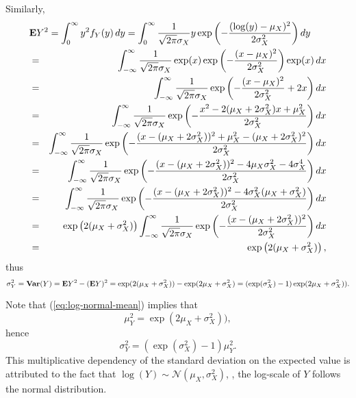 Similarly,
\begin{eqnarray*}
\lefteqn{
\Expect Y^2 = \int_{0}^{\infty} y^2 f_Y(y) \, dy
= \int_{0}^{\infty} \frac{1}{\sqrt{2\pi} \sigma_X }  y \exp\left(-\frac{(\log(y)-\mu_X)^2}{2\sigma_X^2}\right) dy
}
\\
&=&
\int_{-\infty}^{\infty} \frac{1}{\sqrt{2\pi} \sigma_X }  \exp(x) \exp\left(-\frac{(x-\mu_X)^2}{2\sigma_X^2}\right) \exp(x) \, dx
\\
&=&
\int_{-\infty}^{\infty} \frac{1}{\sqrt{2\pi} \sigma_X }  \exp\left(-\frac{(x-\mu_X)^2}{2\sigma_X^2}+2x\right) dx
\\
&=&
\int_{-\infty}^{\infty} \frac{1}{\sqrt{2\pi} \sigma_X }  \exp\left(-\frac{x^2 - 2(\mu_X +2\sigma_X^2)x + \mu_X^2}{2\sigma_X^2}\right) dx
\\
&=&
\int_{-\infty}^{\infty} \frac{1}{\sqrt{2\pi} \sigma_X }  \exp\left(-\frac{(x - (\mu_X +2\sigma_X^2))^2 + \mu_X^2 -(\mu_X+2\sigma_X^2)^2}{2\sigma_X^2}\right) dx
\\
&=&
\int_{-\infty}^{\infty} \frac{1}{\sqrt{2\pi} \sigma_X }  \exp\left(-\frac{(x - (\mu_X +2\sigma_X^2))^2 - 4\mu_X\sigma_X^2 - 4\sigma_X^4}{2\sigma_X^2}\right) dx
\\
&=&
\int_{-\infty}^{\infty} \frac{1}{\sqrt{2\pi} \sigma_X }  \exp\left(-\frac{(x - (\mu_X +2\sigma_X^2))^2 - 4\sigma_X^2(\mu_X+ \sigma_X^2)}{2\sigma_X^2}\right) dx
\\
&=&
\exp\left({2(\mu_X+ \sigma_X^2)}\right)
\int_{-\infty}^{\infty} \frac{1}{\sqrt{2\pi} \sigma_X }  \exp\left(-\frac{(x - (\mu_X +2\sigma_X^2))^2 }{2\sigma_X^2}\right) dx
\\
&=&
\exp\left({2(\mu_X+ \sigma_X^2)}\right),
\end{eqnarray*}
thus
\begin{equation}
\label{eq:log-normal-var}
\sigma_Y^2 =
\mathop{\bf Var{}}(Y) = {\bf E{}} Y^2 - ({\bf E{}} Y)^2 = \exp(2(\mu_X+\sigma_X^2)) - \exp(2\mu_X+\sigma_X^2)
= (\exp(\sigma_X^2)-1) \exp(2\mu_X+\sigma_X^2)).
\end{equation}

Note that (\ref{eq:log-normal-mean}) implies that
\begin{equation}
\mu_Y^2
= \exp(2\mu_X+\sigma_X^2)),
\end{equation}
hence
\begin{equation}
\sigma_Y^2
= (\exp(\sigma_X^2)-1) \mu_Y^2.
\end{equation}
This multiplicative dependency of the standard deviation on the expected value
is attributed to the fact that $\log(Y) \sim \mathcal{N}(\mu_X,\sigma_X^2)$,
\ie,
the log-scale of $Y$ follows the normal distribution.

